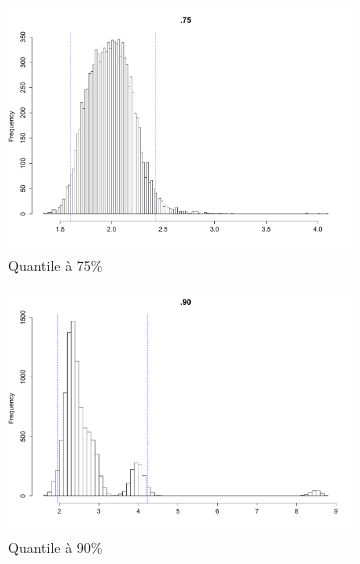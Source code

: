 \documentclass{article}
\renewcommand*{\(}{ \left( }
\renewcommand*{\)}{ \right) }
\begin{document}
\begin{figure}[H]
    \centering
    \begin{subfigure}[t]{0.3\textwidth}
        \includegraphics[width = \linewidth]{img/BootstrapSmooth-75-30.pdf}
        \caption{Quantile à 75\%}
        \label{fig:smooth3B75}
    \end{subfigure}%
    \begin{subfigure}[t]{0.3\textwidth}
        \includegraphics[width = \linewidth]{img/BootstrapSmooth-90-30.pdf}
        \caption{Quantile à 90\%}
        \label{fig:smooth390}
    \end{subfigure}%
    \begin{subfigure}[t]{0.3\textwidth}

\end{subfigure}
\end{figure}
\end{document}
